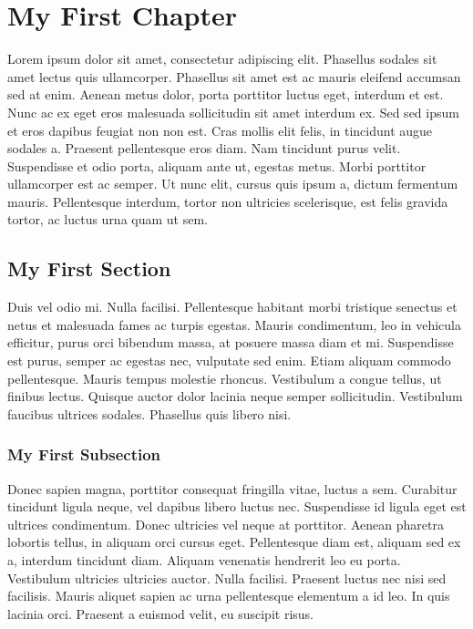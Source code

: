 \documentclass{report}
\begin{document}
	\chapter{My First Chapter}
	
	Lorem ipsum dolor sit amet, consectetur adipiscing elit. Phasellus sodales sit amet lectus quis ullamcorper. Phasellus sit amet est ac mauris eleifend accumsan sed at enim. Aenean metus dolor, porta porttitor luctus eget, interdum et est. Nunc ac ex eget eros malesuada sollicitudin sit amet interdum ex. Sed sed ipsum et eros dapibus feugiat non non est. Cras mollis elit felis, in tincidunt augue sodales a. Praesent pellentesque eros diam. Nam tincidunt purus velit. Suspendisse et odio porta, aliquam ante ut, egestas metus. Morbi porttitor ullamcorper est ac semper. Ut nunc elit, cursus quis ipsum a, dictum fermentum mauris. Pellentesque interdum, tortor non ultricies scelerisque, est felis gravida tortor, ac luctus urna quam ut sem.
	
	\section{My First Section}
	
	Duis vel odio mi. Nulla facilisi. Pellentesque habitant morbi tristique senectus et netus et malesuada fames ac turpis egestas. Mauris condimentum, leo in vehicula efficitur, purus orci bibendum massa, at posuere massa diam et mi. Suspendisse est purus, semper ac egestas nec, vulputate sed enim. Etiam aliquam commodo pellentesque. Mauris tempus molestie rhoncus. Vestibulum a congue tellus, ut finibus lectus. Quisque auctor dolor lacinia neque semper sollicitudin. Vestibulum faucibus ultrices sodales. Phasellus quis libero nisi.
	
	\subsection{My First Subsection}
	
	Donec sapien magna, porttitor consequat fringilla vitae, luctus a sem. Curabitur tincidunt ligula neque, vel dapibus libero luctus nec. Suspendisse id ligula eget est ultrices condimentum. Donec ultricies vel neque at porttitor. Aenean pharetra lobortis tellus, in aliquam orci cursus eget. Pellentesque diam est, aliquam sed ex a, interdum tincidunt diam. Aliquam venenatis hendrerit leo eu porta. Vestibulum ultricies ultricies auctor. Nulla facilisi. Praesent luctus nec nisi sed facilisis. Mauris aliquet sapien ac urna pellentesque elementum a id leo. In quis lacinia orci. Praesent a euismod velit, eu suscipit risus.
	
\end{document}
